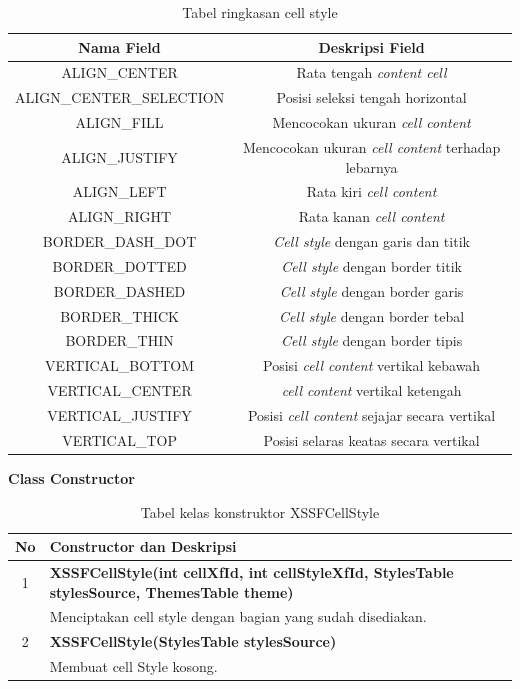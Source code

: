 \begin{table}[H]
		\centering
		\caption{Tabel ringkasan cell style}
		\label{tab:ringkasan_cell_style}
	\begin{tabular}{|c|c|}
		\hline
		\textbf{Nama Field} & \textbf{Deskripsi Field} \\ \hline \hline
		ALIGN\_CENTER & Rata tengah \textit{content cell}\\ \hline 
		ALIGN\_CENTER\_SELECTION &	Posisi seleksi tengah horizontal\\ \hline 
		ALIGN\_FILL & Mencocokan ukuran \textit{cell content} \\ \hline
		ALIGN\_JUSTIFY	&	Mencocokan ukuran \textit{cell content} terhadap lebarnya\\ \hline
		ALIGN\_LEFT	&	Rata kiri \textit{cell content}\\ \hline
		ALIGN\_RIGHT &	Rata kanan \textit{cell content}\\ \hline
		BORDER\_DASH\_DOT &	\textit{Cell style} dengan garis dan titik \\ \hline
		BORDER\_DOTTED &	\textit{Cell style} dengan border titik\\ \hline
		BORDER\_DASHED &	\textit{Cell style} dengan border garis\\ \hline
		BORDER\_THICK &	\textit{Cell style} dengan border tebal\\ \hline
		BORDER\_THIN &	\textit{Cell style} dengan border tipis\\ \hline
		VERTICAL\_BOTTOM &	Posisi \textit{cell content} vertikal kebawah\\ \hline
		VERTICAL\_CENTER & \textit{cell content} vertikal ketengah\\ \hline
		VERTICAL\_JUSTIFY &	Posisi \textit{cell content} sejajar secara vertikal \\ \hline
		VERTICAL\_TOP &	Posisi selaras keatas secara vertikal\\ \hline
	\end{tabular}
\end{table}

\noindent \textbf{Class Constructor}
\begin{table}[H]
		\centering
		\caption{Tabel kelas konstruktor XSSFCellStyle}
		\label{tab:konstrukXSSFCellStyle}
	\begin{tabular}{|c|p{15cm}|}
		\hline
		\textbf{No} & \textbf{Constructor dan Deskripsi} \\ \hline \hline
		1 & \textbf{XSSFCellStyle(int cellXfId, int cellStyleXfId, StylesTable stylesSource, ThemesTable theme)}\\
			&	Menciptakan cell style dengan bagian yang sudah disediakan.\\ \hline
		2 & \textbf{XSSFCellStyle(StylesTable stylesSource)}\\
			&	Membuat cell Style kosong.\\ \hline 	
	\end{tabular}
\end{table}

